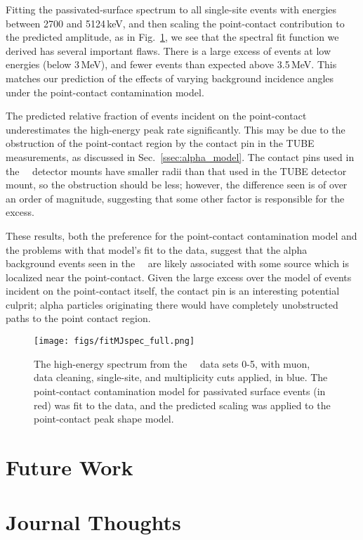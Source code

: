 \documentclass[groupedaddress,rmp,amsmath,amssymb,bibnotes,altaffilletter,twocolumn]{revtex4-1}
\begin{document}
Fitting the passivated-surface spectrum to all single-site events with energies between 2700 and 5124\,keV, and then scaling the point-contact contribution to the predicted amplitude, as in Fig.~\ref{fig:mjSpec_fit}, we see that the spectral fit function we derived has several important flaws. There is a large excess of events at low energies (below 3\,MeV), and fewer events than expected above 3.5\,MeV. This matches our prediction of the effects of varying background incidence angles under the point-contact contamination model. 

The predicted relative fraction of events incident on the point-contact underestimates the high-energy peak rate significantly. This may be due to the obstruction of the point-contact region by the contact pin in the TUBE measurements, as discussed in Sec.~\ref{ssec:alpha_model}. The contact pins used in the \MJ\ \DEM\ detector mounts have smaller radii than that used in the TUBE detector mount, so the obstruction should be less; however, the difference seen is of over an order of magnitude, suggesting that some other factor is responsible for the excess.

These results, both the preference for the point-contact contamination model and the problems with that model's fit to the data, suggest that the alpha background events seen in the \MJ\ \DEM\ are likely associated with some source which is localized near the point-contact. Given the large excess over the model of events incident on the point-contact itself, the contact pin is an interesting potential culprit; alpha particles originating there would have completely unobstructed paths to the point contact region. 

\begin{figure}[]
 \centering
 \texttt{[image: figs/fitMJspec\_full.png]}
 \caption{The high-energy spectrum from the \MJ\ \DEM\, data sets 0-5, with muon, data cleaning, single-site, and multiplicity cuts applied, in blue. The point-contact contamination model for passivated surface events (in red) was fit to the data, and the predicted scaling was applied to the point-contact peak shape model.} 
 \label{fig:mjSpec_fit}
\end{figure}

\section{Future Work}



\section{Journal Thoughts}





\end{document}
